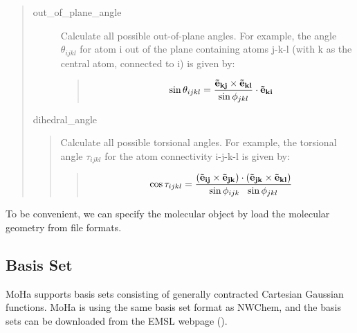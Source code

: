 \documentclass[letterpaper,10pt,english]{sphinxmanual}
\begin{document}
\begin{quote}
\begin{description}
\item[{out\_of\_plane\_angle}] \leavevmode
Calculate all possible out-of-plane angles. For example, the angle \(\theta_{ijkl}\) for atom i out of the plane containing atoms j-k-l (with k as the central atom, connected to i) is given by:
\begin{quote}
\begin{equation*}
\begin{split}\sin {\theta_{ijkl}} =  \frac{{\bf \vec{e}_{kj} \times \vec{e}_{kl} }}{ \sin {\phi_{jkl}}} \cdot  {\bf \vec{e}_{ki} }\end{split}
\end{equation*}\end{quote}

\end{description}

dihedral\_angle
\begin{quote}

Calculate all possible torsional angles. For example, the torsional angle \(\tau_{ijkl}\) for the atom connectivity i-j-k-l is given by:
\begin{quote}
\begin{equation*}
\begin{split}\cos {\tau_{ijkl}} = \frac{ ({\bf \vec{e}_{ij} \times \vec{e}_{jk} }) \cdot ( {\bf \vec{e}_{jk} \times \vec{e}_{kl} } ) }{  \sin {\phi_{ijk}} \  \ \sin{\phi_{jkl}}}\end{split}
\end{equation*}\end{quote}
\end{quote}
\end{quote}

To be convenient, we can specify the molecular object by load the molecular geometry from file formats.

%
\begin{sphinxVerbatim}[commandchars=\\\{\}]
  
\end{sphinxVerbatim}


\subsection{Basis Set}
\label{\detokenize{user_molecular_system:basis-set}}
MoHa supports basis sets consisting of generally contracted Cartesian Gaussian
functions. MoHa is using the same basis set format as NWChem, and the basis sets can be downloaded from the EMSL webpage ().
\end{document}
